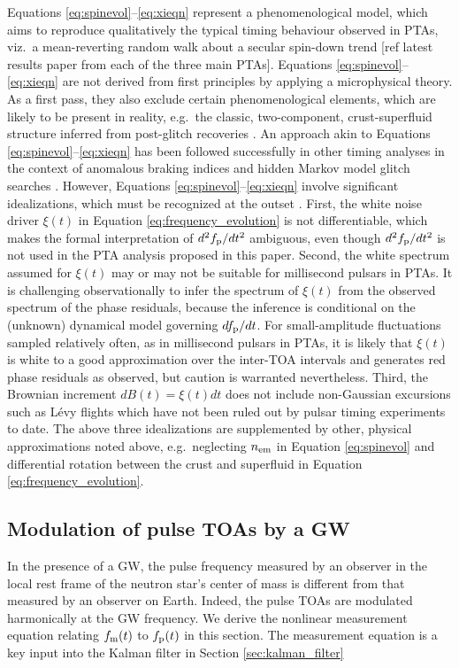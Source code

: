\documentclass[fleqn,usenatbib,useAMS]{mnras}
\begin{document}
Equations \ref{eq:spinevol}--\ref{eq:xieqn} represent a phenomenological model, which aims to reproduce qualitatively the typical timing behaviour observed in PTAs, viz.\ a mean-reverting random walk about a secular spin-down trend [ref latest results paper from each of the three main PTAs]. Equations \ref{eq:spinevol}--\ref{eq:xieqn} are not derived from first principles by applying a microphysical theory. As a first pass, they also exclude certain phenomenological elements, which are likely to be present in reality, e.g.\ the classic, two-component, crust-superfluid structure inferred from post-glitch recoveries \citep{Baym1969,vanEysden,Alpar2017MNRAS.471.4827G}. An approach akin to Equations \ref{eq:spinevol}--\ref{eq:xieqn} has been followed successfully in other timing analyses in the context of anomalous braking indices \citep{Vargas} and hidden Markov model glitch searches \citep{Melatos2020ApJ...896...78M,Lower2021MNRAS.508.3251L,Dunn2022,Dunn2023MNRAS.522.5469D}. However, Equations \ref{eq:spinevol}--\ref{eq:xieqn}  involve significant idealizations, which must be recognized at the outset \citep{Meyers2021,Myers2021MNRAS.502.3113M,Vargas}. First, the white noise driver $\xi(t)$ in Equation \ref{eq:frequency_evolution} is not differentiable, which makes the formal interpretation of $d^2 f_{\rm p} / dt^2$ ambiguous, even though $d^2 f_{\rm p} / dt^2$ is not used in the PTA analysis proposed in this paper. Second, the white spectrum assumed for $\xi(t)$ may or may not be suitable for millisecond pulsars in PTAs. It is challenging observationally to infer the spectrum of $\xi(t)$ from the observed spectrum of the phase residuals, because the inference is conditional on the (unknown) dynamical model governing $df_{\rm p}/dt$. For small-amplitude fluctuations sampled relatively often, as in millisecond pulsars in PTAs, it is likely that $\xi(t)$ is white to a good approximation over the inter-TOA intervals and generates red phase residuals as observed, but caution is warranted nevertheless. Third, the Brownian increment $dB(t)=\xi(t)dt$ does not include non-Gaussian excursions such as L\'{e}vy flights \citep{Sornette2004} which have not been ruled out by pulsar timing experiments to date. The above three idealizations are supplemented by other, physical approximations noted above, e.g.\ neglecting $n_{\rm em}$ in Equation \ref{eq:spinevol} and differential rotation between the crust and superfluid in Equation \ref{eq:frequency_evolution}.



\subsection{Modulation of pulse TOAs by a GW} \label{sec:psr_measured}
In the presence of a GW, the pulse frequency measured by an observer in the local rest frame of the neutron star's center of mass is different from that measured by an observer on Earth. Indeed, the pulse TOAs are modulated harmonically at the GW frequency. We derive the nonlinear measurement equation relating $f_{\rm m}(t)$ to $f_{\rm p}(t)$ in this section. The measurement equation is a key input into the Kalman filter in Section \ref{sec:kalman_filter}
\end{document}
